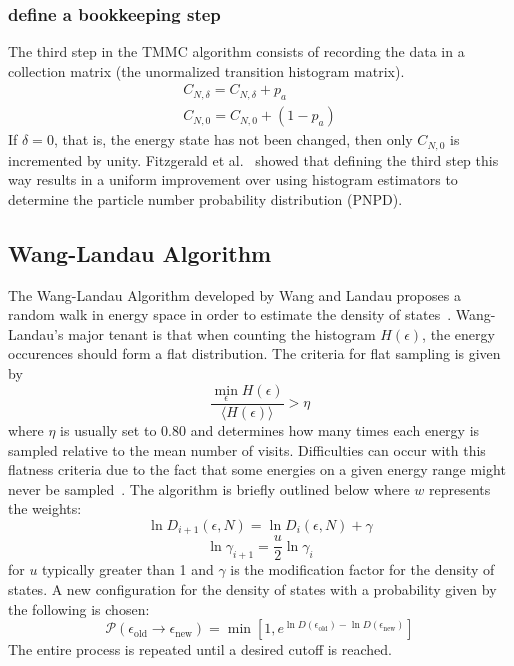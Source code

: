 \documentclass[letterpaper,twocolumn,amsmath,amssymb,pre,aps,10pt]{revtex4-1}
\begin{document}
\subsubsection{define a bookkeeping step}
The third step in the TMMC algorithm consists of recording the data in
a collection matrix (the unormalized transition histogram matrix).
\begin{align}
  C_{N,\delta} = C_{N,\delta} + p_{a}\\
  C_{N,0} = C_{N,0} +(1 - p_{a})
\end{align} If $\delta=0$, that is, the energy state has not been
changed, then only $C_{N,0}$ is incremented by unity. Fitzgerald et
al.~\cite{fitzgerald2000monte} showed that defining the third step this
way results in a uniform improvement over using histogram estimators to
determine the particle number probability distribution (PNPD).

\subsection{Wang-Landau Algorithm}

The Wang-Landau Algorithm developed by Wang and Landau proposes a
random walk in energy space in order to estimate the density of
states~\cite{wang2001efficient,wang2001determining, landau2014guide}.
Wang-Landau's major tenant is that when counting the histogram
$H(\epsilon)$, the energy occurences should form a flat distribution.
The criteria for flat sampling is given by
\begin{equation}
	\frac{\min_{\epsilon} H(\epsilon)}
	{\big\langle H(\epsilon)\big\rangle }
	> \eta
\end{equation}
where $\eta$ is usually set to $0.80$ and determines how many times
each energy is sampled relative to the mean number of visits.
Difficulties can occur with this flatness criteria due to the fact that
some energies on a given energy range might never be
sampled~\cite{haber2014transition}. The algorithm is briefly outlined
below where $w$ represents the weights:
\begin{equation}
	\ln{D_{i+1}(\epsilon,N)}=\ln{D_{i}(\epsilon,N)}
	+\gamma
\end{equation}
\begin{equation}
	\ln{\gamma_{i+1}}=\frac{u}{2}\ln{\gamma_{i}}
\end{equation}
for $u$ typically greater than 1 and $\gamma$ is the modification
factor for the density of states.  A new configuration for the density
of states with a probability given by the following is chosen:
\begin{equation}
	\mathcal{P}(\epsilon_\text{old} \rightarrow \epsilon_\text{new})
	= \min[1,e^{\ln{D(\epsilon_\text{old})}-\ln{D(\epsilon_\text{new})}}]
\end{equation}
The entire process is repeated until a desired cutoff is reached.
\end{document}
